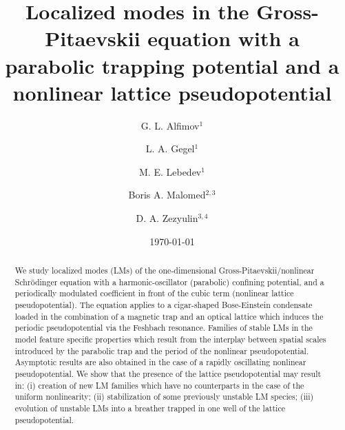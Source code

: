 \documentclass[aps,preprint,showkeys,
]{revtex4}
\begin{document}
\title{Localized modes in the Gross-Pitaevskii equation with a parabolic
trapping potential and a nonlinear lattice pseudopotential}
\author{G. L. Alfimov$^{1}$}
\author{L. A. Gegel$^{1}$}
\author{M. E. Lebedev$^{1}$}
\author{Boris A. Malomed$^{2,3}$}
\author{D. A. Zezyulin$^{3,4}$}

\begin{abstract}
We study localized modes (LMs) of the one-dimensional
Gross-Pitaevskii/nonlinear Schr\"{o}dinger equation with a
harmonic-oscillator (parabolic) confining potential, %
and a periodically modulated coefficient in front of the cubic term
(nonlinear lattice pseudopotential). The equation applies to a cigar-shaped
Bose-Einstein condensate loaded in the combination of a magnetic trap and an
optical lattice which induces the periodic pseudopotential via the Feshbach
resonance. Families of stable LMs in the model feature specific properties
which result from the interplay between spatial scales introduced by the
parabolic trap and the period of the nonlinear pseudopotential. Asymptotic
results are also obtained in the case of a rapidly oscillating nonlinear
pseudopotential. We show that the presence of the lattice pseudopotential
may result in: (i) creation of new LM families which have no counterparts in
the case of the uniform nonlinearity; (ii) stabilization of some previously
unstable LM species; (iii) evolution of unstable LMs into a breather trapped
in one well of the lattice pseudopotential.
\end{abstract}

\date{\today}
\maketitle

\end{document}
